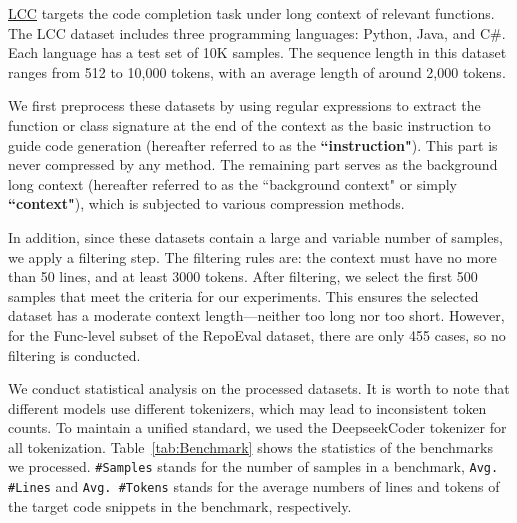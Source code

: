 
\underline{LCC} targets the code
completion task under long context of relevant functions. The LCC dataset includes three programming languages: Python, Java, and C\#. Each language has a test set of 10K samples. The sequence length in this dataset ranges from 512 to 10,000 tokens, with an average length of around 2,000 tokens.


We first preprocess these datasets by using regular expressions to extract the function or class signature at the end of the context as the basic instruction to guide code generation (hereafter referred to as the \textbf{``instruction"}). This part is never compressed by any method. The remaining part serves as the background long context (hereafter referred to as the ``background context" or simply \textbf{``context"}), which is subjected to various compression methods.

In addition, since these datasets contain a large and variable number of samples, we apply a filtering step. The filtering rules are: the context must have no more than 50 lines, and at least 3000 tokens. After filtering, we select the first 500 samples that meet the criteria for our experiments. This ensures the selected dataset has a moderate context length—neither too long nor too short. However, for the Func-level subset of the RepoEval dataset, there are only 455 cases, so no filtering is conducted.

We conduct statistical analysis on the processed datasets. It is worth to note that different models use different tokenizers, which may lead to inconsistent token counts. To maintain a unified standard, we used the DeepseekCoder tokenizer for all tokenization. Table~\ref{tab:Benchmark} shows the statistics of the benchmarks we processed. \texttt{\#Samples} stands for the number of samples in a benchmark,  \texttt{Avg. \#Lines} and \texttt{Avg. \#Tokens} stands for the average numbers of lines and tokens of the target code snippets in the benchmark, respectively. 

